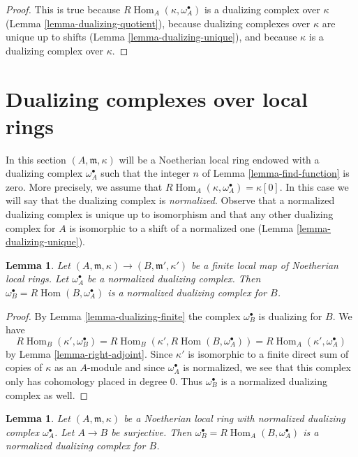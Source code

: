 \documentclass{stacks-project}
\theoremstyle{plain}
\newtheorem{lemma}[subsection]{Lemma}
\theoremstyle{definition}
\theoremstyle{remark}
\numberwithin{equation}{subsection}
\def\Hom{\mathop{\mathrm{Hom}}\nolimits}
\begin{document}
\begin{proof}
This is true because $R\Hom_A(\kappa, \omega_A^\bullet)$ is a dualizing
complex over $\kappa$ (Lemma \ref{lemma-dualizing-quotient}),
because dualizing complexes over $\kappa$ are unique up to shifts
(Lemma \ref{lemma-dualizing-unique}), and because $\kappa$ is a
dualizing complex over $\kappa$.
\end{proof}




\section{Dualizing complexes over local rings}
\label{section-dualizing-local}

\noindent
In this section $(A, \mathfrak m, \kappa)$ will be a Noetherian local
ring endowed with a dualizing complex $\omega_A^\bullet$ such that
the integer $n$ of Lemma \ref{lemma-find-function} is zero.
More precisely, we assume that $R\Hom_A(\kappa, \omega_A^\bullet) = \kappa[0]$.
In this case we will say that the dualizing complex is {\it normalized}.
Observe that a normalized dualizing complex is unique up to
isomorphism and that any other dualizing complex for $A$ is isomorphic
to a shift of a normalized one (Lemma \ref{lemma-dualizing-unique}).

\begin{lemma}
\label{lemma-normalized-finite}
Let $(A, \mathfrak m, \kappa) \to (B, \mathfrak m', \kappa')$
be a finite local map of Noetherian local rings. Let $\omega_A^\bullet$
be a normalized dualizing complex. Then
$\omega_B^\bullet = R\Hom(B, \omega_A^\bullet)$ is a
normalized dualizing complex for $B$.
\end{lemma}

\begin{proof}
By Lemma \ref{lemma-dualizing-finite} the complex
$\omega_B^\bullet$ is dualizing for $B$. We have
$$
R\Hom_B(\kappa', \omega_B^\bullet) =
R\Hom_B(\kappa', R\Hom(B, \omega_A^\bullet)) =
R\Hom_A(\kappa', \omega_A^\bullet)
$$
by Lemma \ref{lemma-right-adjoint}. Since $\kappa'$ is isomorphic
to a finite direct sum of copies of $\kappa$ as an $A$-module
and since $\omega_A^\bullet$ is normalized, we
see that this complex only has cohomology placed in degree $0$.
Thus $\omega_B^\bullet$ is a normalized dualizing complex as well.
\end{proof}

\begin{lemma}
\label{lemma-normalized-quotient}
Let $(A, \mathfrak m, \kappa)$ be a Noetherian local
ring with normalized dualizing complex $\omega_A^\bullet$.
Let $A \to B$ be surjective. Then
$\omega_B^\bullet = R\Hom_A(B, \omega_A^\bullet)$ is a
normalized dualizing complex for $B$.
\end{lemma}
\end{document}
